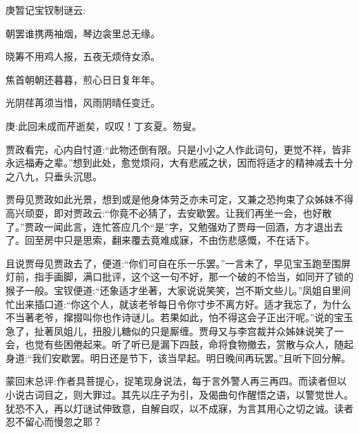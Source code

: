 \begin{poem}
    \begin{note} 庚暂记宝钗制谜云:\end{note}

    \begin{pl} 朝罢谁携两袖烟，琴边衾里总无缘。\end{pl}

    \begin{pl} 晓筹不用鸡人报，五夜无烦侍女添。\end{pl}

    \begin{pl} 焦首朝朝还暮暮，煎心日日复年年。\end{pl}

    \begin{pl} 光阴荏苒须当惜，风雨阴晴任变迁。\end{pl}
\end{poem}


\begin{parag}
    \begin{note}庚:此回未成而芹逝矣，叹叹！丁亥夏。笏叟。\end{note}
\end{parag}


\begin{parag}
    贾政看完，心内自忖道:“此物还倒有限。只是小小之人作此词句，更觉不祥，皆非永远福寿之辈。”想到此处，愈觉烦闷，大有悲戚之状，因而将适才的精神减去十分之八九，只垂头沉思。
\end{parag}


\begin{parag}
    贾母见贾政如此光景，想到或是他身体劳乏亦未可定，又兼之恐拘束了众姊妹不得高兴顽耍，即对贾政云:“你竟不必猜了，去安歇罢。让我们再坐一会，也好散了。”贾政一闻此言，连忙答应几个“是”字，又勉强劝了贾母一回酒，方才退出去了。回至房中只是思索，翻来覆去竟难成寐，不由伤悲感慨，不在话下。
\end{parag}


\begin{parag}
    且说贾母见贾政去了，便道:“你们可自在乐一乐罢。”一言未了，早见宝玉跑至围屏灯前，指手画脚，满口批评，这个这一句不好，那一个破的不恰当，如同开了锁的猴子一般。宝钗便道:“还象适才坐著，大家说说笑笑，岂不斯文些儿。”凤姐自里间忙出来插口道:“你这个人，就该老爷每日令你寸步不离方好。适才我忘了，为什么不当著老爷，撺掇叫你也作诗谜儿。若果如此，怕不得这会子正出汗呢。”说的宝玉急了，扯著凤姐儿，扭股儿糖似的只是厮缠。贾母又与李宫裁并众姊妹说笑了一会，也觉有些困倦起来。听了听已是漏下四鼓，命将食物撤去，赏散与众人，随起身道:“我们安歇罢。明日还是节下，该当早起。明日晚间再玩罢。”且听下回分解。
\end{parag}


\begin{parag}
    \begin{note}蒙回末总评:作者具菩提心，捉笔现身说法，每于言外警人再三再四。而读者但以小说古词目之，则大罪过。其先以庄子为引，及偈曲句作醒悟之语，以警觉世人。犹恐不入，再以灯谜试伸致意，自解自叹，以不成寐，为言其用心之切之诚。读者忍不留心而慢忽之耶？\end{note}
\end{parag}

